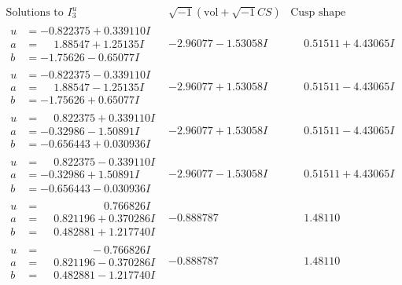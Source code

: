 \documentclass[1p]{elsarticle_modified}
\theoremstyle{definition}
\newcommand{\I}{\sqrt{-1}}
\begin{document}
$$\begin{array}{c|c|c}  
\text{Solutions to }I^u_{3}& \I (\text{vol} + \sqrt{-1}CS) & \text{Cusp shape}\\
 \hline 
\begin{aligned}
u &= -0.822375 + 0.339110 I \\
a &= \phantom{-}1.88547 + 1.25135 I \\
b &= -1.75626 - 0.65077 I\end{aligned}
 & -2.96077 - 1.53058 I & \phantom{-}0.51511 + 4.43065 I \\ \hline\begin{aligned}
u &= -0.822375 - 0.339110 I \\
a &= \phantom{-}1.88547 - 1.25135 I \\
b &= -1.75626 + 0.65077 I\end{aligned}
 & -2.96077 + 1.53058 I & \phantom{-}0.51511 - 4.43065 I \\ \hline\begin{aligned}
u &= \phantom{-}0.822375 + 0.339110 I \\
a &= -0.32986 - 1.50891 I \\
b &= -0.656443 + 0.030936 I\end{aligned}
 & -2.96077 + 1.53058 I & \phantom{-}0.51511 - 4.43065 I \\ \hline\begin{aligned}
u &= \phantom{-}0.822375 - 0.339110 I \\
a &= -0.32986 + 1.50891 I \\
b &= -0.656443 - 0.030936 I\end{aligned}
 & -2.96077 - 1.53058 I & \phantom{-}0.51511 + 4.43065 I \\ \hline\begin{aligned}
u &= \phantom{-0.000000 -}0.766826 I \\
a &= \phantom{-}0.821196 + 0.370286 I \\
b &= \phantom{-}0.482881 + 1.217740 I\end{aligned}
 & -0.888787\phantom{ +0.000000I} & \phantom{-}1.48110\phantom{ +0.000000I} \\ \hline\begin{aligned}
u &= \phantom{-0.000000 } -0.766826 I \\
a &= \phantom{-}0.821196 - 0.370286 I \\
b &= \phantom{-}0.482881 - 1.217740 I\end{aligned}
 & -0.888787\phantom{ +0.000000I} & \phantom{-}1.48110\phantom{ +0.000000I} \\ \hline\begin{aligned}

\end{aligned}
\end{array}$$
\end{document}
